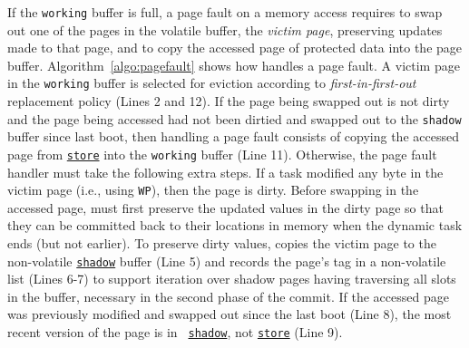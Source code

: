 If the \texttt{working} buffer is full, a page fault on a memory access requires \sys to swap out one of the pages in the volatile buffer, the \emph{victim page}, preserving updates made to that page, and to copy the accessed page of protected data into the page buffer. Algorithm~\ref{algo:pagefault} shows how \sys handles a page fault. A victim page in the \texttt{working} buffer is selected for eviction according to \emph{first-in-first-out} replacement policy (Lines 2 and 12). If the page being swapped out is not dirty and the page being accessed had not been dirtied and swapped out to the \texttt{shadow} buffer since last boot, then handling a page fault consists of copying the accessed page from \texttt{\underline{store}} into the \texttt{working} buffer (Line 11). Otherwise, the page fault handler must take the following extra steps.
%
If a task modified any byte in the victim page (i.e., using \texttt{WP}), then the page is dirty. Before swapping in the accessed page, \sys must first preserve the updated values in the dirty page so that they can be committed back to their locations in memory when the dynamic task ends (but not earlier). To preserve dirty values, \sys copies the victim page to the non-volatile \texttt{\underline{shadow}} buffer (Line 5) and records the page's tag in a non-volatile list (Lines 6-7) to support iteration over shadow pages having traversing all slots in the buffer, necessary in the second phase of the commit.
%
%
If the accessed page was previously modified and swapped out since the last boot (Line 8), the most recent version of the page is in {\tt
\underline{shadow}}, not \texttt{\underline{store}} (Line 9).


%

